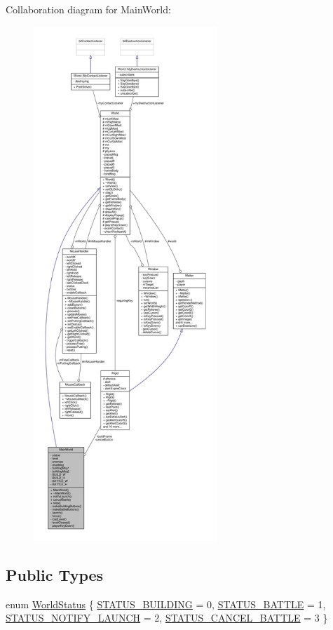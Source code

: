 Collaboration diagram for Main\+World\+:
\nopagebreak
\begin{figure}[H]
\begin{center}
\leavevmode
\includegraphics[height=550pt]{classMainWorld__coll__graph}
\end{center}
\end{figure}
\subsection*{Public Types}
\begin{DoxyCompactItemize}
\item 
enum \hyperlink{classMainWorld_ab0b1d1d54026f907ddc7fcc858ea48f3}{World\+Status} \{ \hyperlink{classMainWorld_ab0b1d1d54026f907ddc7fcc858ea48f3af96d574a62f6b5920f3fad277d995fb7}{S\+T\+A\+T\+U\+S\+\_\+\+B\+U\+I\+L\+D\+I\+N\+G} = 0, 
\hyperlink{classMainWorld_ab0b1d1d54026f907ddc7fcc858ea48f3a56955ec18d3375dec123f1d3d65c7393}{S\+T\+A\+T\+U\+S\+\_\+\+B\+A\+T\+T\+L\+E} = 1, 
\hyperlink{classMainWorld_ab0b1d1d54026f907ddc7fcc858ea48f3adf5d74eb401b14e4f5f33d375d6ffedd}{S\+T\+A\+T\+U\+S\+\_\+\+N\+O\+T\+I\+F\+Y\+\_\+\+L\+A\+U\+N\+C\+H} = 2, 
\hyperlink{classMainWorld_ab0b1d1d54026f907ddc7fcc858ea48f3a0adce04cf20701967507ab5eb64e2011}{S\+T\+A\+T\+U\+S\+\_\+\+C\+A\+N\+C\+E\+L\+\_\+\+B\+A\+T\+T\+L\+E} = 3
 \}
\end{DoxyCompactItemize}
